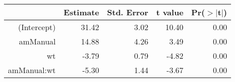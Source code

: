 \begin{tabular}{rrrrr}
  \hline
 & Estimate & Std. Error & t value & Pr($>$$|$t$|$) \\ 
  \hline
(Intercept) & 31.42 & 3.02 & 10.40 & 0.00 \\ 
  amManual & 14.88 & 4.26 & 3.49 & 0.00 \\ 
  wt & -3.79 & 0.79 & -4.82 & 0.00 \\ 
  amManual:wt & -5.30 & 1.44 & -3.67 & 0.00 \\ 
   \hline
\end{tabular}
